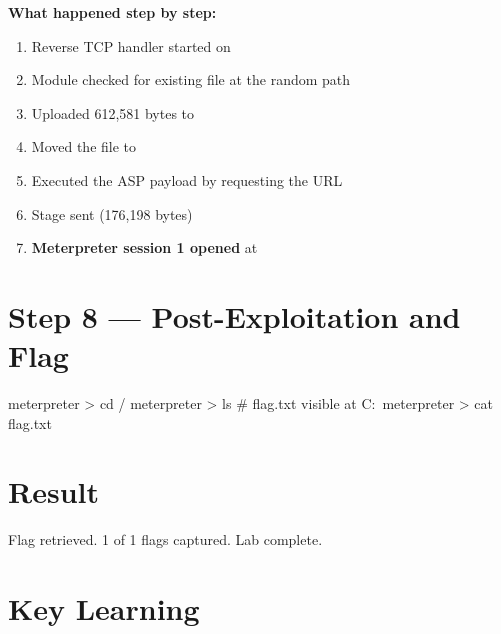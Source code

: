 \textbf{What happened step by step:}
\begin{enumerate}
  \item Reverse TCP handler started on 
  \item Module checked for existing file at the random path
  \item Uploaded 612,581 bytes to 
  \item Moved the file to 
  \item Executed the ASP payload by requesting the URL
  \item Stage sent (176,198 bytes)
  \item \textbf{Meterpreter session 1 opened} at 
\end{enumerate}


\section*{Step 8 --- Post-Exploitation and Flag}

\begin{termbox}
meterpreter > cd /
meterpreter > ls
# flag.txt visible at C:\
meterpreter > cat flag.txt
\end{termbox}



\section*{Result}

Flag retrieved. 1 of 1 flags captured. Lab complete.

\section*{Key Learning}

